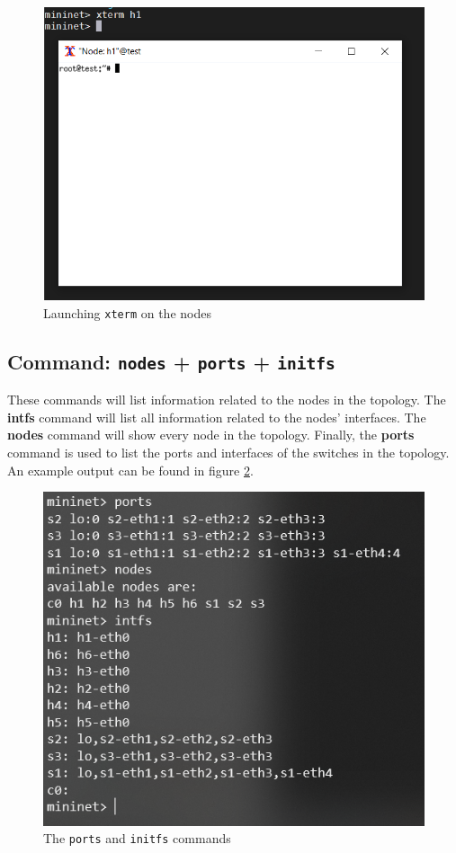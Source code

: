 \documentclass[12pt]{report}
\begin{document}
			\begin{figure}
				\centering
				\includegraphics[scale = 1]{xterm.png}
				\caption{Launching \texttt{xterm} on the nodes}
				\label{f:xterm}
			\end{figure}

		\subsection{Command: \texttt{nodes} + \texttt{ports} + \texttt{initfs}}
			These commands will list information related to the nodes in the topology. The \textbf{intfs} command will list all information related to the nodes' interfaces. The  \textbf{nodes} command will show every node in the topology. Finally, the \textbf{ports} command is used to list the ports and interfaces of the switches in the topology. An example output can be found in figure \ref{f:initfs}.

			\begin{figure}
				\centering
				\includegraphics[scale = 1]{initfs_cmd.png}
				\caption{The \texttt{ports} and \texttt{initfs} commands}
				\label{f:initfs}
			\end{figure}
\end{document}
